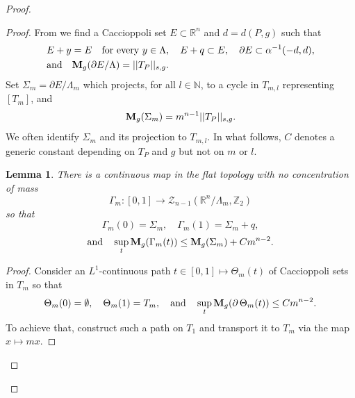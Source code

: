 \documentclass[11pt]{amsart}
\def\R{\mathbb R}
\def\N{\mathbb N}
\def\Z{\mathbb Z}
\newtheorem{lemm}[thm]{Lemma}
\theoremstyle{remark}
\theoremstyle{definition}
\begin{document}
\begin{proof}
\begin{proof}
			{From \cite[Section 8]{caffarelli-lalave}} we find a Caccioppoli set $E\subset\R^n$ and $d=d(P,g)$ such that
			$$
			\begin{aligned}
				&E+y=E\quad\text{for every }y\in\Lambda,\quad E+q\subset E,\quad \partial E\subset \alpha^{-1}(-d,d),\\
				&\text{and}\quad{\bf M}_g(\partial E/\Lambda)=||T_P||_{s,g}.
			\end{aligned}
			$$
			Set $\Sigma_m=\partial E/\Lambda_m$ which projects, for all $l\in\N$, to a cycle in $T_{m,l}$ representing $[T_m]$, and
			\begin{equation}\label{plane.like.mass}
				{\bf M}_g(\Sigma_m)=m^{n-1}||T_P||_{s,g}.
			\end{equation}
			We often identify $\Sigma_m$ and its projection to $T_{m,l}$. 
			In what follows, $C$ denotes a generic constant depending on {$T_P$} and $g$ but not on $m$ or $l$. 
			{\begin{lemm}\label{path.gmt}
					There is a continuous map in the flat topology with no concentration of mass
					$$\Gamma_m:[0,1]\rightarrow \mathcal Z_{n-1}(\R^n/\Lambda_m,\Z_2)$$
					so that
					$$\Gamma_m(0)=\Sigma_m,\quad \Gamma_m(1)=\Sigma_m+q, $$
					\begin{equation}\label{zipper.bound}
						\text{and}\quad \sup_t{\bf M}_g(\Gamma_m(t))\leq {\bf M}_g(\Sigma_m)+Cm^{n-2}.
					\end{equation}
			\end{lemm}}
			\begin{proof}
				Consider an $L^1$-continuous path $t\in[0,1]\mapsto \Theta_m(t)$ of Caccioppoli sets in $T_m$ so that
				\begin{equation}\label{zipper.bound2}
					\Theta_m(0)=\emptyset,\quad\Theta_m(1)=T_m,\quad\text{and}\quad\sup_t{\bf M}_g(\partial\,\Theta_m(t))\leq Cm^{n-2}.
				\end{equation}
				To achieve that, construct such a path on  $T_1$ and transport it to $T_m$ via the map $x\mapsto mx$. 
				

\end{proof}
\end{proof}
\end{proof}
\end{document}
